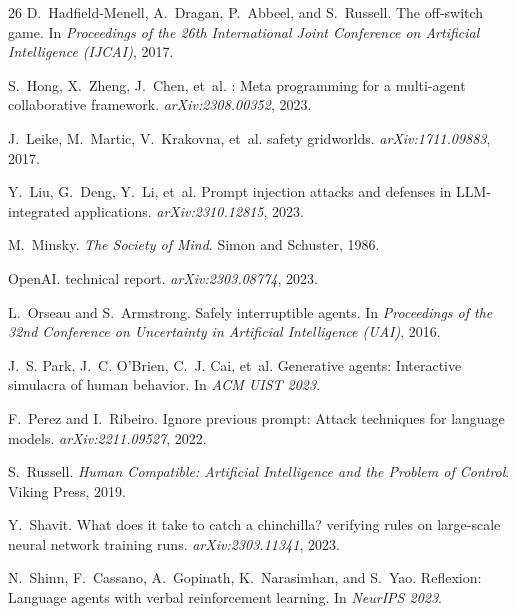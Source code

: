 \documentclass[11pt,a4paper]{article}
\begin{document}
\begin{thebibliography}{26}
D.~Hadfield-Menell, A.~Dragan, P.~Abbeel, and S.~Russell.
\newblock The off-switch game.
\newblock In \textit{Proceedings of the 26th International Joint Conference on Artificial
  Intelligence (IJCAI)}, 2017.

S.~Hong, X.~Zheng, J.~Chen, et~al.
: Meta programming for a multi-agent collaborative framework.
\newblock \textit{arXiv:2308.00352}, 2023.

J.~Leike, M.~Martic, V.~Krakovna, et~al.
 safety gridworlds.
\newblock \textit{arXiv:1711.09883}, 2017.

Y.~Liu, G.~Deng, Y.~Li, et~al.
\newblock Prompt injection attacks and defenses in {LLM}-integrated applications.
\newblock \textit{arXiv:2310.12815}, 2023.

M.~Minsky.
\newblock \textit{The Society of Mind}.
\newblock Simon and Schuster, 1986.

OpenAI.
 technical report.
\newblock \textit{arXiv:2303.08774}, 2023.

L.~Orseau and S.~Armstrong.
\newblock Safely interruptible agents.
\newblock In \textit{Proceedings of the 32nd Conference on Uncertainty in Artificial Intelligence
  (UAI)}, 2016.

J.~S. Park, J.~C. O'Brien, C.~J. Cai, et~al.
\newblock Generative agents: Interactive simulacra of human behavior.
\newblock In \textit{ACM UIST 2023}.

F.~Perez and I.~Ribeiro.
\newblock Ignore previous prompt: Attack techniques for language models.
\newblock \textit{arXiv:2211.09527}, 2022.

S.~Russell.
\newblock \textit{Human Compatible: Artificial Intelligence and the Problem of Control}.
\newblock Viking Press, 2019.

Y.~Shavit.
\newblock What does it take to catch a chinchilla? verifying rules on large-scale neural network training runs.
\newblock \textit{arXiv:2303.11341}, 2023.

N.~Shinn, F.~Cassano, A.~Gopinath, K.~Narasimhan, and S.~Yao.
\newblock Reflexion: Language agents with verbal reinforcement learning.
\newblock In \textit{NeurIPS 2023}.


\end{thebibliography}
\end{document}
